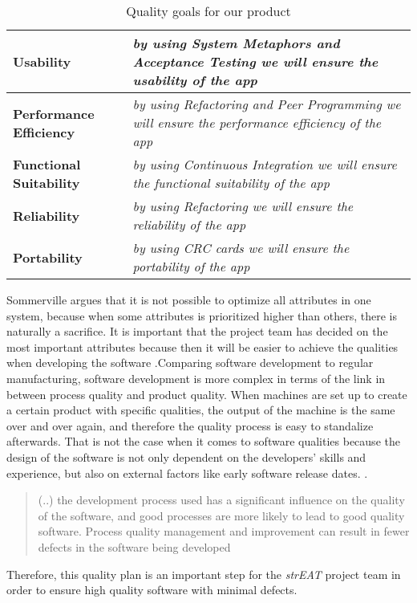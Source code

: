 \begin{table}[h!]
\centering
\begin{tabular}{@{}p{}p{}@{}}
\toprule
\textbf{Usability}              & \textit{by using System Metaphors and Acceptance Testing we will ensure the usability of the app}       \\ \midrule
\textbf{Performance Efficiency} & \textit{by using Refactoring and Peer Programming we will ensure the performance efficiency of the app} \\ \midrule
\textbf{Functional Suitability} & \textit{by using Continuous Integration we will ensure the functional suitability of the app}           \\ \midrule
\textbf{Reliability}            & \textit{by using Refactoring we will ensure the reliability of the app}                                 \\ \midrule
\textbf{Portability}            & \textit{by using CRC cards we will ensure the portability of the app}                                   \\ \bottomrule
\end{tabular}
\caption{Quality goals for our product}
\label{product_qualities}
\end{table}

Sommerville argues that it is not possible to optimize all attributes in one system, because when some attributes is prioritized higher than others, there is naturally a sacrifice. It is important that the project team has decided on the most important attributes because then it will be easier to achieve the qualities when developing the software \cite[p. 704]{Sommerville}.Comparing software development to regular manufacturing, software development is more complex in terms of the link in between process quality and product quality. When machines are set up to create a certain product with specific qualities, the output of the machine is the same over and over again, and therefore the quality process is easy to standalize afterwards. That is not the case when it comes to software qualities because the design of the software is not only dependent on the developers' skills and experience, but also on external factors like early software release dates. \cite[p.705]{Sommerville}. \begin{quotation} (..) the development process used has a significant influence on the quality of the software, and good processes are more likely to lead to good quality software. Process quality management and improvement can result in fewer defects in the software being developed \cite[p.705]{Sommerville} \end{quotation}
Therefore, this quality plan is an important step for the \textit{strEAT} project team in order to ensure high quality software with minimal defects.
